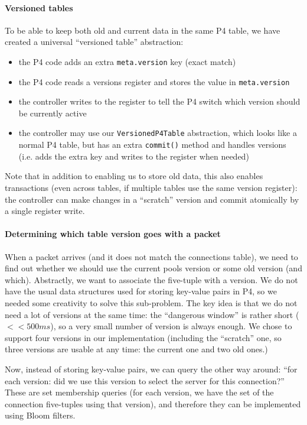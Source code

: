 \documentclass[11pt,oneside,a4paper]{article}
\begin{document}
\paragraph{Versioned tables}
To be able to keep both old and current data in the same P4 table, we have
created a universal ``versioned table'' abstraction:

\begin{itemize}
\item the P4 code adds an extra \texttt{meta.version} key (exact match)
\item the P4 code reads a versions register and stores the value in
    \texttt{meta.version}
\item the controller writes to the register to tell the P4 switch which version
    should be currently active
\item the controller may use our \texttt{VersionedP4Table} abstraction, which
    looks like a normal P4 table, but has an extra \texttt{commit()} method and
    handles versions (i.e.  adds the extra key and writes to the register when
    needed)
\end{itemize}

Note that in addition to enabling us to store old data, this also enables
transactions (even across tables, if multiple tables use the same version
register): the controller can make changes in a ``scratch'' version and commit
atomically by a single register write.

\paragraph{Determining which table version goes with a packet}

When a packet arrives (and it does not match the connections table), we need to
find out whether we should use the current pools version or some old version
(and which).
Abstractly, we want to associate the five-tuple with a version.
We do not have the usual data structures used for storing key-value pairs in P4,
so we needed some creativity to solve this sub-problem.
The key idea is that we do not need a lot of versions at the same time: the
``dangerous window'' is rather short ($<<500ms$), so a very small number of
version is always enough.
We chose to support four versions in our implementation (including the
``scratch'' one, so three versions are usable at any time: the current one and
two old ones.)

Now, instead of storing key-value pairs, we can query the other way around:
``for each version: did we use this version to select the server for this
connection?''
These are set membership queries (for each version, we have the set of the
connection five-tuples using that version), and therefore they can be
implemented using Bloom filters.
\end{document}
